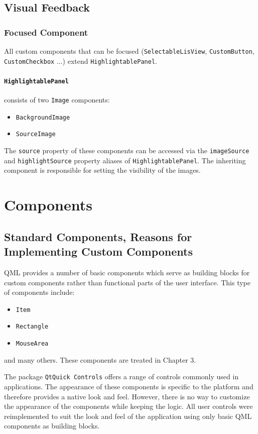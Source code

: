 \subsection{Visual Feedback}
\subsubsection{Focused Component}
All custom components that can be focused ({\tt SelectableLisView}, {\tt CustomButton}, {\tt CustomCheckbox} ...) extend {\tt HighlightablePanel}.{}
\paragraph{\tt HighlightablePanel} consists of two {\tt Image} components:
\begin{itemize}
	\item {{\tt BackgroundImage}}
	\item {{\tt SourceImage}}
\end{itemize}
The {\tt source} property of these components can be accessed via the {\tt imageSource} and {\tt highlightSource} property aliases of {\tt HighlightablePanel}. The inheriting component is responsible for setting the visibility of the images.
\section {Components}
\subsection{Standard Components, Reasons for Implementing Custom Components}
QML provides a number of basic components which serve as building blocks for custom components rather than functional parts of the user interface.
This type of components include:
\begin{itemize}
	\item{{\tt Item}}
	\item{{\tt Rectangle}}
	\item{{\tt MouseArea}}
\end{itemize}
and many others. These components are treated in Chapter 3.

The package {\tt QtQuick Controls} offers a range of controls commonly used in applications. The appearance of these components is specific to the platform and therefore provides a native look and feel. However, there is no way to customize the appearance of the components while keeping the logic. All user controls were reimplemented to suit the look and feel of the application using only basic QML components as building blocks.

